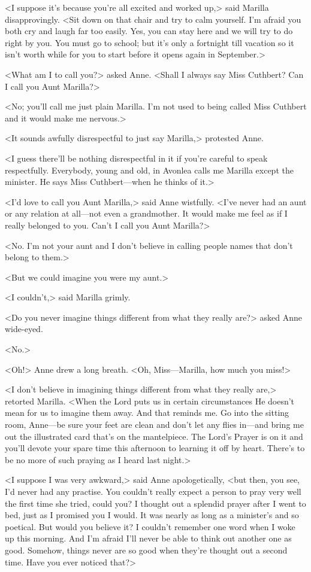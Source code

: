 <I suppose it's because you're all excited and worked up,> said Marilla disapprovingly. <Sit down on that chair and try to calm yourself. I'm afraid you both cry and laugh far too easily. Yes, you can stay here and we will try to do right by you. You must go to school; but it's only a fortnight till vacation so it isn't worth while for you to start before it opens again in September.>

<What am I to call you?> asked Anne. <Shall I always say Miss Cuthbert? Can I call you Aunt Marilla?>

<No; you'll call me just plain Marilla. I'm not used to being called Miss Cuthbert and it would make me nervous.>

<It sounds awfully disrespectful to just say Marilla,> protested Anne.

<I guess there'll be nothing disrespectful in it if you're careful to speak respectfully. Everybody, young and old, in Avonlea calls me Marilla except the minister. He says Miss Cuthbert—when he thinks of it.>

<I'd love to call you Aunt Marilla,> said Anne wistfully. <I've never had an aunt or any relation at all—not even a grandmother. It would make me feel as if I really belonged to you. Can't I call you Aunt Marilla?>

<No. I'm not your aunt and I don't believe in calling people names that don't belong to them.>

<But we could imagine you were my aunt.>

<I couldn't,> said Marilla grimly.

<Do you never imagine things different from what they really are?> asked Anne wide-eyed.

<No.>

<Oh!> Anne drew a long breath. <Oh, Miss—Marilla, how much you miss!>

<I don't believe in imagining things different from what they really are,> retorted Marilla. <When the Lord puts us in certain circumstances He doesn't mean for us to imagine them away. And that reminds me. Go into the sitting room, Anne—be sure your feet are clean and don't let any flies in—and bring me out the illustrated card that's on the mantelpiece. The Lord's Prayer is on it and you'll devote your spare time this afternoon to learning it off by heart. There's to be no more of such praying as I heard last night.>

<I suppose I was very awkward,> said Anne apologetically, <but then, you see, I'd never had any practise. You couldn't really expect a person to pray very well the first time she tried, could you? I thought out a splendid prayer after I went to bed, just as I promised you I would. It was nearly as long as a minister's and so poetical. But would you believe it? I couldn't remember one word when I woke up this morning. And I'm afraid I'll never be able to think out another one as good. Somehow, things never are so good when they're thought out a second time. Have you ever noticed that?>


